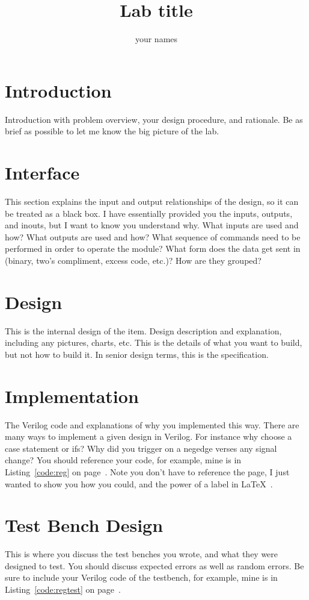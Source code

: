 \documentclass{article}
\author{your names}
\title{Lab title}
\newcommand{\Verilog}[3]{
  \lstset{language=Verilog}
  \lstset{backgroundcolor=\color{listinggray},rulecolor=\color{blue}}
  \lstset{linewidth=\textwidth}
  \lstset{commentstyle=\textit, stringstyle=\upshape,showspaces=false}
  \lstset{frame=tb}
  
}
\begin{document}
\maketitle

\section{Introduction}
Introduction with problem overview, your design procedure, and rationale.  Be as brief as possible to let me know the big picture of the lab.

\section{Interface}
This section explains the input and output relationships of the design, so it can be treated as a black box.  I have essentially provided you the inputs, outputs, and inouts, but I want to know you understand why.  What inputs are used and how?  What outputs are used and how?  What sequence of commands need to be performed in order to operate the module?  What form does the data get sent in (binary, two's compliment, excess code, etc.)?  How are they grouped?

\section{Design}
This is the internal design of the item.  Design description and explanation, including any pictures, charts, etc.  This is the details of what you want to build, but not how to build it.  In senior design terms, this is the specification.

\section{Implementation}
The Verilog code and explanations of why you implemented this way.  There are many ways to implement a given design in Verilog.  For instance why choose a case statement or ifs?  Why did you trigger on a negedge verses any signal change?  You should reference your code, for example, mine is in Listing~\ref{code:reg} on page~\pageref{code:reg}.  Note you don't have to reference the page, I just wanted to show you how you could, and the power of a label in \LaTeX\ .


\section{Test Bench Design}
This is where you discuss the test benches you wrote, and what they were designed to test.  You should discuss expected errors as well as random errors.  Be sure to include your Verilog code of the testbench, for example, mine is in Listing~\ref{code:regtest} on page~\pageref{code:regtest}.
\end{document}

